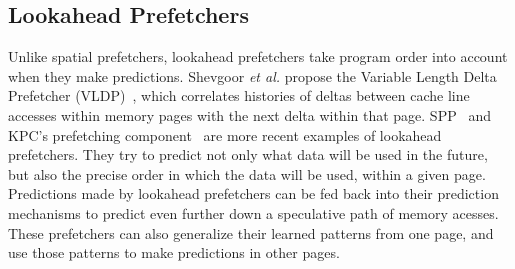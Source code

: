 

\subsection{Lookahead Prefetchers}

Unlike spatial prefetchers, lookahead prefetchers take program order
into account when they make predictions.  Shevgoor \textit{et al.}
propose the Variable Length Delta Prefetcher (VLDP)~\cite{VLDP}, which
correlates histories of deltas between cache line accesses within
memory pages with the next delta within that page. SPP~\cite{SPP} and
KPC's prefetching component~\cite{KPC} are more recent examples of
lookahead prefetchers. They try to predict not only what data will be
used in the future, but also the precise order in which the data will
be used, within a given page. Predictions made by lookahead
prefetchers can be fed back into their prediction mechanisms to
predict even further down a speculative path of memory acesses. These
prefetchers can also generalize their learned patterns from one page,
and use those patterns to make predictions in other pages.


